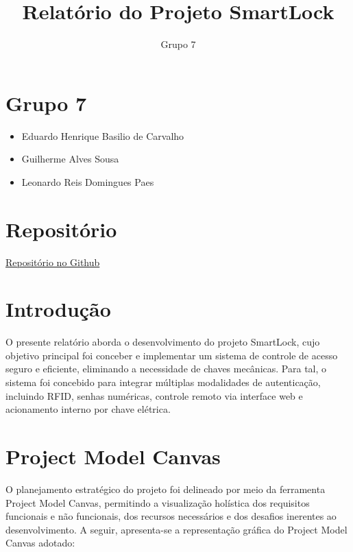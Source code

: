 \documentclass{article}
\title{Relatório do Projeto SmartLock}
\author{Grupo 7}
\date{}
\begin{document}
\maketitle

\section*{Grupo 7}
\begin{itemize}
    \item Eduardo Henrique Basilio de Carvalho
    \item Guilherme Alves Sousa
    \item Leonardo Reis Domingues Paes
\end{itemize}

\section*{Repositório}
\href{https://github.com/eduardo-ufmg/EEE026_SisEmbutidos}{Repositório no Github}

\section*{Introdução}
O presente relatório aborda o desenvolvimento do projeto SmartLock, cujo objetivo principal foi conceber e implementar um sistema de controle de acesso seguro e eficiente, eliminando a necessidade de chaves mecânicas. Para tal, o sistema foi concebido para integrar múltiplas modalidades de autenticação, incluindo RFID, senhas numéricas, controle remoto via interface web e acionamento interno por chave elétrica.

\section*{Project Model Canvas}
O planejamento estratégico do projeto foi delineado por meio da ferramenta Project Model Canvas, permitindo a visualização holística dos requisitos funcionais e não funcionais, dos recursos necessários e dos desafios inerentes ao desenvolvimento. A seguir, apresenta-se a representação gráfica do Project Model Canvas adotado:
\end{document}
